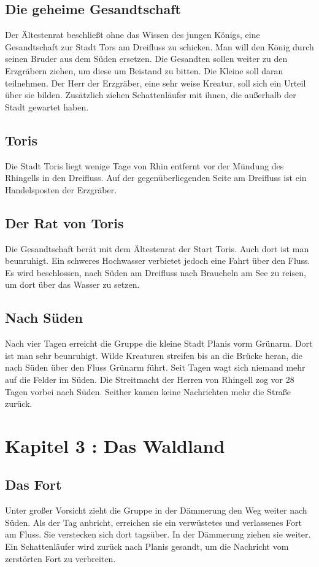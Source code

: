 \documentclass[12pt,a4paper,onecolumn,twoside,ngerman]{book}
\begin{document}
\section{Die geheime Gesandtschaft}
Der Ältestenrat beschließt ohne das Wissen des jungen Königs, eine Gesandtschaft zur Stadt Tors am Dreifluss zu schicken. Man will den König durch seinen Bruder aus dem Süden ersetzen. Die Gesandten sollen weiter zu den Erzgräbern ziehen, um diese um Beistand zu bitten. Die Kleine soll daran teilnehmen. Der Herr der Erzgräber, eine sehr weise Kreatur, soll sich ein Urteil über sie bilden. Zusätzlich ziehen Schattenläufer mit ihnen, die außerhalb der Stadt gewartet haben.

\section{Toris}
Die Stadt Toris liegt wenige Tage von Rhin entfernt vor der Mündung des Rhingells in den Dreifluss. Auf der gegenüberliegenden Seite am Dreifluss ist ein Handelsposten der Erzgräber.

\section{Der Rat von Toris}
Die Gesandtschaft berät mit dem Ältestenrat der Start Toris. Auch dort ist man beunruhigt. Ein schweres Hochwasser verbietet jedoch eine Fahrt über den Fluss. Es wird beschlossen, nach Süden am Dreifluss nach Braucheln am See zu reisen, um dort über das Wasser zu setzen.

\section{Nach Süden}
Nach vier Tagen erreicht die Gruppe die kleine Stadt Planis vorm Grünarm. Dort ist man sehr beunruhigt. Wilde Kreaturen streifen bis an die Brücke heran, die nach Süden über den Fluss Grünarm führt. Seit Tagen wagt sich niemand mehr auf die Felder im Süden. Die Streitmacht der Herren von Rhingell zog vor 28 Tagen vorbei nach Süden. Seither kamen keine Nachrichten mehr die Straße zurück.
 

\chapter{Kapitel 3 : Das Waldland}
\section{Das Fort}
Unter großer Vorsicht zieht die Gruppe in der Dämmerung den Weg weiter nach Süden. Als der Tag anbricht, erreichen sie ein verwüstetes und verlassenes Fort am Fluss. Sie verstecken sich dort tagsüber. In der Dämmerung ziehen sie weiter. Ein Schattenläufer wird zurück nach Planis gesandt, um die Nachricht vom zerstörten Fort zu verbreiten.
\end{document}
